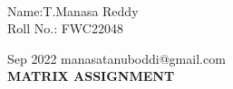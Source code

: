 \documentclass[10pt,a4paper]{report}
\begin{document}
 \vspace{3mm}\\ \raggedleft Name:T.Manasa Reddy\vspace{2mm}\\ \raggedleft Roll No.: FWC22048\vspace{2mm}\\ \raggedright Sep 2022 \hspace{12cm} \raggedleft manasatanuboddi@gmail.com \vspace{10mm}
\\ \centering \Large \textbf{MATRIX ASSIGNMENT} \normalsize \vspace{15mm}
\end{document}
